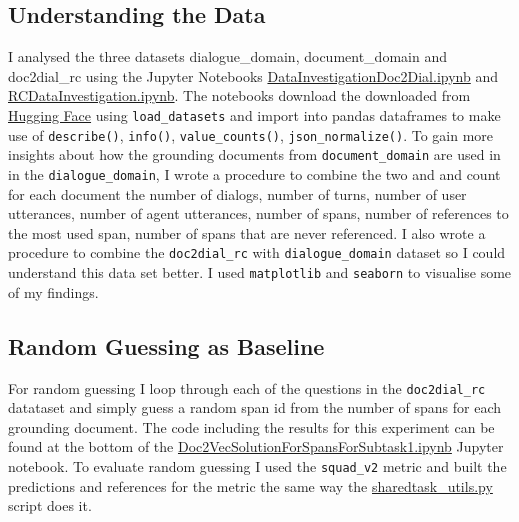 \documentclass[11pt]{article}
\begin{document}
    \subsection{Understanding the Data}\label{subsec:understanding-the-data-experiment}
    I analysed the three datasets dialogue\_domain, document\_domain and doc2dial\_rc using the Jupyter Notebooks
    \href{https://github.com/isabelladegen/nlp-2021/blob/main/notebooks/DataInvestigationDoc2Dial.ipynb}{DataInvestigationDoc2Dial.ipynb}
    and \href{https://github.com/isabelladegen/nlp-2021/blob/main/notebooks/RCDataInvestigation.ipynb}{RCDataInvestigation.ipynb}.
    The notebooks download the downloaded from \href{https://huggingface.co/datasets/doc2dial}{Hugging Face}
    using \texttt{load\_datasets} and import into pandas dataframes \cite{reback2020pandas} to make use of
    \texttt{describe()}, \texttt{info()}, \texttt{value\_counts()}, \texttt{json\_normalize()}. To gain more insights
    about how the grounding documents from \texttt{document\_domain} are used in in the \texttt{dialogue\_domain},
    I wrote a procedure to combine the two and and count for each document the number of dialogs, number of turns, number of user utterances,
    number of agent utterances, number of spans, number of references to the most used span, number of spans that are never referenced.
    I also wrote a procedure to combine the \texttt{doc2dial\_rc} with \texttt{dialogue\_domain} dataset so I could understand
    this data set better. I used \texttt{matplotlib} \cite{matplotlib} and \texttt{seaborn} \cite{seaborn} to visualise
    some of my findings.

    \subsection{Random Guessing as Baseline}\label{subsec:random-guessing-experiment}
    For random guessing I loop through each of the questions in the \texttt{doc2dial\_rc} datataset and simply guess a
    random span id from the number of spans for each grounding document. The code including the results for this experiment
    can be found at the bottom of the
    \href{https://github.com/isabelladegen/nlp-2021/blob/main/notebooks/Doc2VecSolutionForSpansForSubtask1.ipynb}{Doc2VecSolutionForSpansForSubtask1.ipynb}
    Jupyter notebook. To evaluate random guessing I used the \texttt{squad\_v2} metric and built the predictions and
    references for the metric the same way the
    \href{https://github.com/doc2dial/sharedtask-dialdoc2021/blob/master/scripts/sharedtask_utils.py}{sharedtask\_utils.py}
    script does it.
\end{document}
